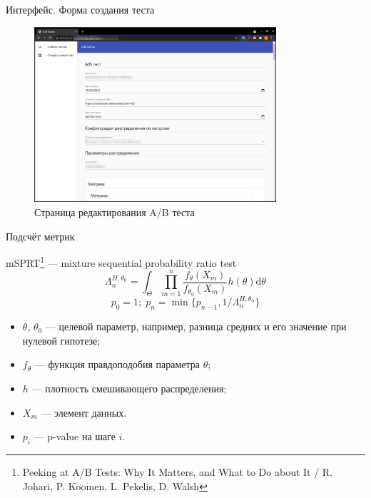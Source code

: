 \documentclass[12pt, unicode]{beamer}
\begin{document}
	\begin{frame}[fragile]{Интерфейс. Форма создания теста}
		\begin{figure}[h]
			\centering
			\includegraphics[width=0.8\textwidth]{edit_page.png}
			\caption{Страница редактирования A/B теста}
		\end{figure}
	\end{frame}
	
	
	\begin{frame}[fragile]{Подсчёт метрик}
		\begin{block}{mSPRT\footnote[1]{
					Peeking at A/B Tests: Why It Matters, and What to Do about It / R. Johari, P.
					Koomen, L. Pekelis, D. Walsh	
				} --- mixture sequential probability ratio test}
			\begin{equation}
				\Lambda_{n}^{H,\theta_0}=\int_{\Theta}\prod\limits_{m=1}^{n}\frac{f_{\theta}(X_m)}{f_{\theta_0}(X_m)}h(\theta)\mathrm{d}\theta
			\end{equation}
			\begin{equation}
				p_0=1;\;p_n=\min\{p_{n-1},1/\Lambda_{n}^{H,\theta_0}\}
			\end{equation}
			\vspace*{-1cm}
			\begin{itemize}
				\item $\theta$, $\theta_0$ --- целевой параметр, например, разница средних и его значение при нулевой гипотезе;
				\item $f_{\theta}$ --- функция правдоподобия параметра $\theta$;
				\item $h$ --- плотность смешивающего распределения;
				\item $X_m$ --- элемент данных.
				\item $p_i$ --- p-value на шаге $i$.
			\end{itemize}
			\vspace*{-0.5cm}
		\end{block}
		\vfill\null
	\end{frame}
\end{document}
